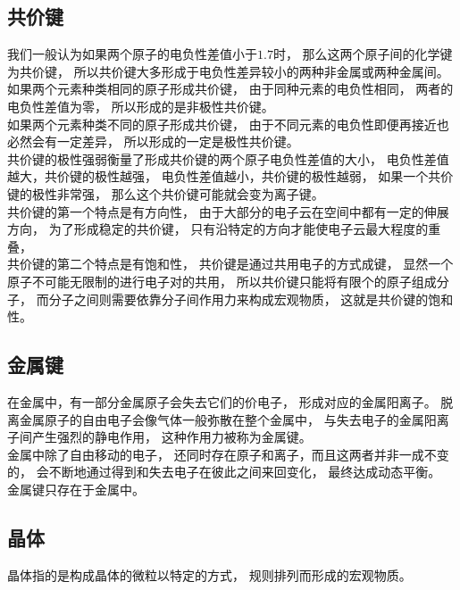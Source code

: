 \documentclass[UTF8]{ctexart}
\begin{document}
\subsection{共价键}
    我们一般认为如果两个原子的电负性差值小于$1.7$时，
    那么这两个原子间的化学键为共价键，
    所以共价键大多形成于电负性差异较小的两种非金属或两种金属间。\\[3mm]
    如果两个元素种类相同的原子形成共价键，
    由于同种元素的电负性相同，
    两者的电负性差值为零，
    所以形成的是非极性共价键。\\[3mm]
    如果两个元素种类不同的原子形成共价键，
    由于不同元素的电负性即便再接近也必然会有一定差异，
    所以形成的一定是极性共价键。\\[3mm]
    共价键的极性强弱衡量了形成共价键的两个原子电负性差值的大小，
    电负性差值越大，共价键的极性越强，
    电负性差值越小，共价键的极性越弱，
    如果一个共价键的极性非常强，
    那么这个共价键可能就会变为离子键。\\[3mm]
    共价键的第一个特点是有方向性，
    由于大部分的电子云在空间中都有一定的伸展方向，
    为了形成稳定的共价键，
    只有沿特定的方向才能使电子云最大程度的重叠，\\[3mm]
    共价键的第二个特点是有饱和性，
    共价键是通过共用电子的方式成键，
    显然一个原子不可能无限制的进行电子对的共用，
    所以共价键只能将有限个的原子组成分子，
    而分子之间则需要依靠分子间作用力来构成宏观物质，
    这就是共价键的饱和性。\\

\subsection{金属键}
    在金属中，有一部分金属原子会失去它们的价电子，
    形成对应的金属阳离子。
    脱离金属原子的自由电子会像气体一般弥散在整个金属中，
    与失去电子的金属阳离子间产生强烈的静电作用，
    这种作用力被称为金属键。\\[3mm]
    金属中除了自由移动的电子，
    还同时存在原子和离子，而且这两者并非一成不变的，
    会不断地通过得到和失去电子在彼此之间来回变化，
    最终达成动态平衡。\\[3mm]
    金属键只存在于金属中。

\newpage

\subsection{晶体}
    晶体指的是构成晶体的微粒以特定的方式，
    规则排列而形成的宏观物质。
\end{document}
